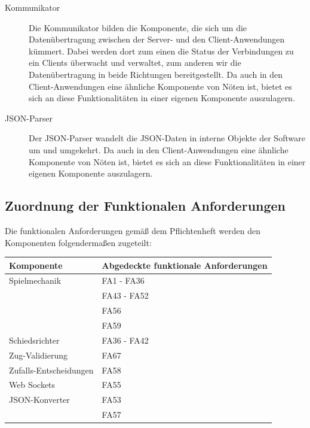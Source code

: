 \begin{description}
			\item[Kommunikator]
			Die Kommunikator bilden die Komponente, die sich um die Datenübertragung zwischen der Server- und den Client-Anwendungen kümmert. Dabei werden dort zum einen die Status der Verbindungen zu ein Clients überwacht und verwaltet, zum anderen wir die Datenübertragung in beide Richtungen bereitgestellt. Da auch in den Client-Anwendungen eine ähnliche Komponente von Nöten ist, bietet es sich an diese Funktionalitäten in einer eigenen Komponente auszulagern.
			
			\item[JSON-Parser]
			Der JSON-Parser wandelt die JSON-Daten in interne Objekte der Software um und umgekehrt. Da auch in den Client-Anwendungen eine ähnliche Komponente von Nöten ist, bietet es sich an diese Funktionalitäten in einer eigenen Komponente auszulagern.  

		\end{description}
		
	\subsection{Zuordnung der Funktionalen Anforderungen}
	
	Die funktionalen Anforderungen gemäß dem Pflichtenheft werden den Komponenten folgendermaßen zugeteilt:

	\begin{table}[h]
	\centering
	\begin{tabular}{|l|l|}
		\hline
		\textbf{Komponente} & \textbf{Abgedeckte funktionale Anforderungen}\\ \hline
		Spielmechanik & FA1 - FA36 \\
		& FA43 - FA52 \\
		& FA56 \\
		& FA59 \\ \hline
		
		Schiedsrichter & FA36 - FA42 \\ \hline
		
		Zug-Validierung & FA67 \\ \hline
		
		Zufalls-Entscheidungen & FA58 \\ \hline	
		
		Web Sockets & FA55 \\ \hline
		
		JSON-Konverter & FA53 \\
		& FA57\\ \hline

	
	\end{tabular}
	\end{table}